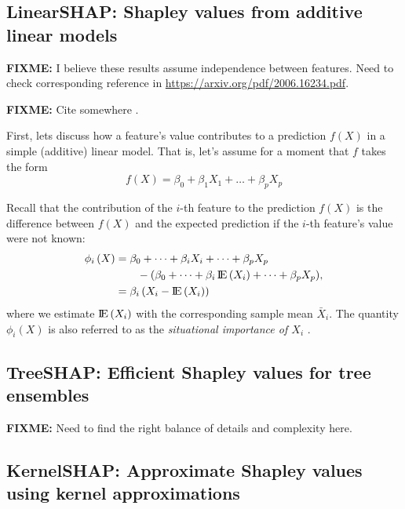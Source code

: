 \subsection{LinearSHAP: Shapley values from additive linear models}

\textbf{FIXME:} I believe these results assume independence between
features. Need to check corresponding reference in
\url{https://arxiv.org/pdf/2006.16234.pdf}.

\textbf{FIXME:} Cite somewhere \cite{strumbelj-2014-explaining}.

First, lets discuss how a feature's value contributes to a prediction
\(f\left(X\right)\) in a simple (additive) linear model. That is, let's
assume for a moment that \(f\) takes the form \begin{equation}
\nonumber
  f\left(X\right) = \beta_0 + \beta_1 X_1 + \dots + \beta_p X_p
\end{equation}

Recall that the contribution of the \(i\)-th feature to the prediction
\(f\left(X\right)\) is the difference between \(f\left(X\right)\) and
the expected prediction if the \(i\)-th feature's value were not known:
\begin{equation}
\nonumber
\begin{split}
  \phi_i\left(X\right) &= \beta_0 + \dots + \beta_i X_i + \dots + \beta_p X_p \\ &\quad\quad - \left(\beta_0 + \dots + \beta_i \E\left(X_i\right) + \dots + \beta_p X_p\right) \\
  &= \beta_i \left(X_i - \E\left(X_i\right)\right)
\end{split},
\end{equation} where we estimate \(\E\left(X_i\right)\) with the
corresponding sample mean \(\bar{X}_i\). The quantity
\(\phi_i\left(X\right)\) is also referred to as the
\emph{situational importance of $X_i$} \citep{achen-1982-interpreting}.

\subsection{TreeSHAP: Efficient Shapley values for tree ensembles}

\textbf{FIXME:} Need to find the right balance of details and complexity
here.

\subsection{KernelSHAP: Approximate Shapley values using kernel approximations}

